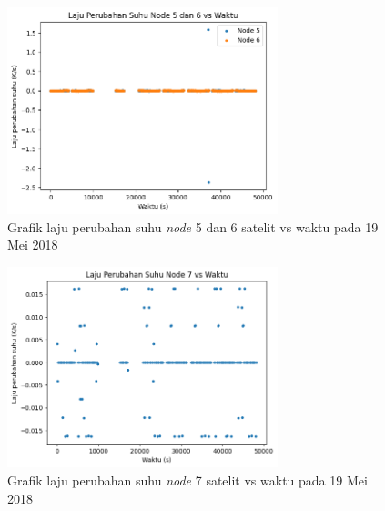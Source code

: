\begin{figure}[H]
\setlength{}
\begin{center}
\includegraphics[width=0.7\textwidth]{fig/base_node56_tempchange_2018-05-19.png}
	\caption{Grafik laju perubahan suhu \textit{node} 5 dan 6 satelit vs waktu pada 19 Mei 2018}
\label{fig:basetempchange5619}
\end{center}
\end{figure}

\begin{figure}[H]
\setlength{}
\begin{center}
\includegraphics[width=0.7\textwidth]{fig/base_node7_tempchange_2018-05-19.png}
	\caption{Grafik laju perubahan suhu \textit{node} 7 satelit vs waktu pada 19 Mei 2018}
\label{fig:basetempchange719}
\end{center}
\end{figure}

